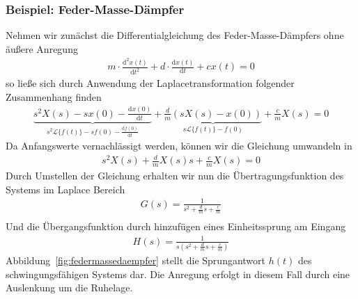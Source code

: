 \subsubsection{Beispiel: Feder-Masse-Dämpfer}
%
Nehmen wir zunächst die Differentialgleichung des Feder-Masse-Dämpfers ohne äußere Anregung
%
\begin{equation*}
\begin{aligned}
m\cdot \frac{\text{d}^{2}x(t)}{\text{d}t^{2}} + d\cdot \frac{\text{d}x(t)}{\text{d}t} + c x(t)=0
\end{aligned}
\end{equation*}
%
so ließe sich durch Anwendung der Laplacetransformation folgender Zusammenhang finden
%
\begin{equation*}
\begin{aligned}
\underbrace{s^{2}X(s)-sx(0)-\frac{\text{d}x(0)}{\text{d}t}}_{s^{2}\mathcal{L}\{f(t)\}-sf(0)-\frac{\text{d}f(0)}{\text{d}t}} + \underbrace{\frac{d}{m}\left(sX(s)-x(0)\right)}_{s\mathcal{L}\{f(t)\}-f(0)} + \frac{c}{m}X(s)=0
\end{aligned}
\end{equation*}
%
Da Anfangswerte vernachlässigt werden, können wir die Gleichung umwandeln in
%
\begin{equation*}
\begin{aligned}
s^{2}X(s) + \frac{d}{m}X(s)s + \frac{c}{m}X(s)=0
\end{aligned}
\end{equation*}
%
Durch Umstellen der Gleichung erhalten wir nun die Übertragungsfunktion des Systems im Laplace Bereich
%
\begin{equation*}
\begin{aligned}
G(s)= \frac{1}{s^{2} + \frac{d}{m}s + \frac{c}{m}}\\
%
\end{aligned}
\end{equation*}
%
Und die Übergangsfunktion durch hinzufügen eines Einheitssprung am Eingang  
%
\begin{equation*}
\begin{aligned}
%
H(s)= \frac{1}{s\left(s^{2} + \frac{d}{m}s + \frac{c}{m}\right)}
%
\end{aligned}
\end{equation*}
%
Abbildung~\ref{fig:federmassedaempfer} stellt die Sprungantwort $h(t)$ des schwingungsfähigen Systems dar. Die Anregung erfolgt in diesem Fall durch eine Auslenkung um die Ruhelage.
%
